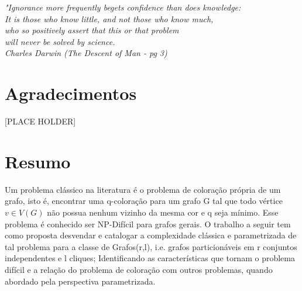 \documentclass[a4paper,oneside,12pt]{book}
\begin{document}
\newpage


\newpage


\begin{flushright}
\begin{minipage}{0.5\textwidth}

\vspace{15.0cm}



\textit{"Ignorance more frequently begets confidence than does knowledge:\\
		It is those who know little, and not those who know much,\\ who so positively assert that this or that problem\\ will never be solved by science.\\
		Charles Darwin (The Descent of Man - pg 3)}
\end{minipage}
\end{flushright}


\chapter*{Agradecimentos}

\thispagestyle{myheadings}

\noindent

[PLACE HOLDER]




\chapter*{Resumo}

\thispagestyle{myheadings}

Um problema clássico na literatura é o problema de coloração própria de um grafo, isto é, encontrar uma q-coloração para um grafo G tal que todo vértice $v \in V(G)$ não possua nenhum vizinho da mesma cor e q seja mínimo. Esse problema é conhecido ser NP-Difícil para grafos gerais. O trabalho a seguir tem como proposta desvendar e catalogar a complexidade clássica e parametrizada de tal problema para a classe de Grafos(r,l), i.e. grafos particionáveis em r conjuntos independentes e l cliques; Identificando as características que tornam o problema difícil e a relação do problema de coloração com outros problemas, quando abordado pela perspectiva parametrizada.
\end{document}
